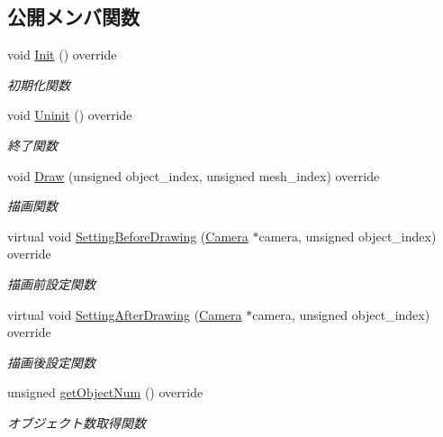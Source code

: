 \subsection*{公開メンバ関数}
\begin{DoxyCompactItemize}
\item 
void \mbox{\hyperlink{class_stencil_shadow_test_draw_a65be72e71cd12cacf315b0364c12c3e3}{Init}} () override
\begin{DoxyCompactList}\small\item\em 初期化関数 \end{DoxyCompactList}\item 
void \mbox{\hyperlink{class_stencil_shadow_test_draw_ad0672bf4ecfc8091cf54ed6f2c76b618}{Uninit}} () override
\begin{DoxyCompactList}\small\item\em 終了関数 \end{DoxyCompactList}\item 
void \mbox{\hyperlink{class_stencil_shadow_test_draw_abb5f9445b7d94c213a3751fa57e36643}{Draw}} (unsigned object\+\_\+index, unsigned mesh\+\_\+index) override
\begin{DoxyCompactList}\small\item\em 描画関数 \end{DoxyCompactList}\item 
virtual void \mbox{\hyperlink{class_stencil_shadow_test_draw_a0f697b6dad67048c7f8916a53cca6b1c}{Setting\+Before\+Drawing}} (\mbox{\hyperlink{class_camera}{Camera}} $\ast$camera, unsigned object\+\_\+index) override
\begin{DoxyCompactList}\small\item\em 描画前設定関数 \end{DoxyCompactList}\item 
virtual void \mbox{\hyperlink{class_stencil_shadow_test_draw_a68917115d3f151ed91ce297924ee5bbb}{Setting\+After\+Drawing}} (\mbox{\hyperlink{class_camera}{Camera}} $\ast$camera, unsigned object\+\_\+index) override
\begin{DoxyCompactList}\small\item\em 描画後設定関数 \end{DoxyCompactList}\item 
unsigned \mbox{\hyperlink{class_stencil_shadow_test_draw_ad93f1c8a60a701d185108896c58dd578}{get\+Object\+Num}} () override
\begin{DoxyCompactList}\small\item\em オブジェクト数取得関数 \end{DoxyCompactList}\item 

\end{DoxyCompactItemize}
